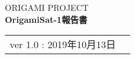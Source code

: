 \begin{titlepage}

\vspace*{10pt} 

\begin{center}

\Large{ORIGAMI PROJECT} \\
\vspace*{210pt}
\huge{\bf OrigamiSat-1報告書} \\ 
\vspace*{130pt}

\end{center}

\vspace*{80pt}

\begin{center}

\Large{
	\begin{tabular}{cc}
		ver 1.0 : 2019年10月13日
	\end{tabular}
}

\vspace{20pt}


\end{center}

\end{titlepage}
